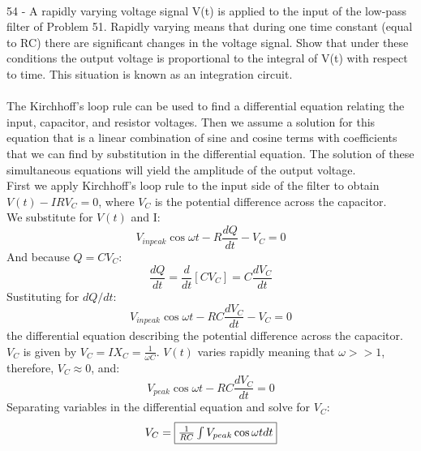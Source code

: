 \documentclass{report}
\begin{document}
\paragraph{}
54 - A rapidly varying voltage signal V(t) is applied to the input of the low-pass filter of Problem 51. Rapidly varying means that during one time constant (equal to RC) there are significant changes in the voltage signal. Show that under these conditions the output voltage is proportional to the integral of V(t) with respect to time. This situation is known as an integration circuit.\\
\\
The Kirchhoff's loop rule can be used to find a differential equation relating the input, capacitor, and resistor voltages. Then we assume a solution for this equation that is a linear combination of sine and cosine terms with coefficients that we can find by substitution in the differential equation. The solution of these simultaneous equations will yield the amplitude of the output voltage.\\
First we apply Kirchhoff's loop rule to the input side of the filter to obtain $V(t) - IR V_C = 0$, where $V_C$ is the potential difference across the capacitor.\\
We substitute for $V(t)$ and I:
$$V_{in peak} \cos \omega t - R\frac{dQ}{dt} - V_C = 0$$
And because $Q = CV_C$:
$$\frac{dQ}{dt} = \frac{d}{dt}[CV_C] = C\frac{dV_C}{dt}$$
Sustituting for $dQ / dt$:
$$V_{in peak} \cos \omega t - RC \frac{dV_C}{dt} - V_C = 0$$
the differential equation describing the potential difference across the capacitor.\\
$V_C$ is given by $V_C = IX_C = \frac{1}{\omega C}$. $V(t)$ varies rapidly meaning that $\omega >> 1$, therefore, $V_C \approx 0$, and:
$$V_{peak} \cos \omega t -RC \frac{dV_C}{dt} = 0$$
Separating variables in the differential equation and solve for $V_C$:
$$V_C = \fbox{$\frac{1}{RC}\int V_{peak} \cos \omega t dt$}$$
\end{document}
